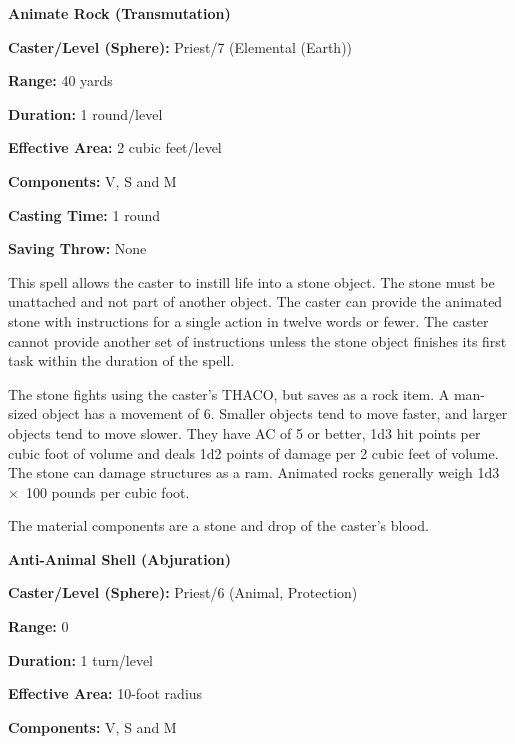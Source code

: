 \begin{multicols}{2}
\noindent
\begin{minipage}{\columnwidth}

\noindent \textbf{Animate Rock (Transmutation)}

\noindent \textbf{Caster/Level (Sphere):} Priest/7 (Elemental (Earth))

\noindent \textbf{Range:} 40 yards

\noindent \textbf{Duration:} 1 round/level

\noindent \textbf{Effective Area:} 2 cubic feet/level

\noindent \textbf{Components:} V, S and M

\noindent \textbf{Casting Time:} 1 round

\noindent \textbf{Saving Throw:} None

\end{minipage}

This spell allows the caster to instill life into a stone object.  The stone must be unattached and not part of another object.  The caster can provide the animated stone with instructions for a single action in twelve words or fewer.  The caster cannot provide another set of instructions unless the stone object finishes its first task within the duration of the spell.

The stone fights using the caster's THACO, but saves as a rock item. A man-sized object has a movement of 6.  Smaller objects tend to move faster, and larger objects tend to move slower.  They have AC of 5 or better, 1d3 hit points per cubic foot of volume and deals 1d2 points of damage per 2 cubic feet of volume.  The stone can damage structures as a ram.  Animated rocks generally weigh 1d3~$\times$~100 pounds per cubic foot.

The material components are a stone and drop of the caster's blood.

\vspace{1em}

\noindent
\begin{minipage}{\columnwidth}

\noindent \textbf{Anti-Animal Shell (Abjuration)}

\noindent \textbf{Caster/Level (Sphere):} Priest/6 (Animal, Protection)

\noindent \textbf{Range:} 0

\noindent \textbf{Duration:} 1 turn/level 

\noindent \textbf{Effective Area:} 10-foot radius

\noindent \textbf{Components:} V, S and M


\end{minipage}
\end{multicols}
